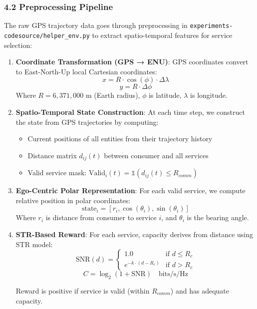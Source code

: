 \hypertarget{preprocessing-pipeline}{%
	\subsubsection{4.2 Preprocessing
		Pipeline}\label{preprocessing-pipeline}}

The raw GPS trajectory data goes through preprocessing in
\texttt{experiments-codesource/helper\_env.py} to extract
spatio-temporal features for service selection:

\begin{enumerate}
	\def\labelenumi{\arabic{enumi}.}
	\item
	      \textbf{Coordinate Transformation (GPS → ENU)}: GPS coordinates
	      convert to East-North-Up local Cartesian coordinates:
	      \[x = R \cdot \cos(\phi) \cdot \Delta\lambda\]
	      \[y = R \cdot \Delta\phi\] Where \(R = 6,371,000\) m (Earth radius),
	      \(\phi\) is latitude, \(\lambda\) is longitude.
	\item
	      \textbf{Spatio-Temporal State Construction}: At each time step, we
	      construct the state from GPS trajectories by computing:

	      \begin{itemize}
		      \tightlist
		      \item
		            Current positions of all entities from their trajectory history
		      \item
		            Distance matrix \(d_{ij}(t)\) between consumer and all services
		      \item
		            Valid service mask:
		            \(\text{Valid}_i(t) = \mathbb{1}(d_{ij}(t) \leq R_{comm})\)
	      \end{itemize}
	\item
	      \textbf{Ego-Centric Polar Representation}: For each valid service, we
	      compute relative position in polar coordinates:
	      \[\text{state}_i = [r_i, \cos(\theta_i), \sin(\theta_i)]\] Where
	      \(r_i\) is distance from consumer to service \(i\), and \(\theta_i\)
	      is the bearing angle.
	\item
	      \textbf{STR-Based Reward}: For each service, capacity derives from
	      distance using STR model:
	      \[\text{SNR}(d) = \begin{cases} 1.0 & \text{if } d \leq R_c \\ e^{-k \cdot (d-R_c)} & \text{if } d > R_c \end{cases}\]
	      \[C = \log_2(1 + \text{SNR}) \quad \text{bits/s/Hz}\]

	      Reward is positive if service is valid (within \(R_{comm}\)) and has
	      adequate capacity.
\end{enumerate}


